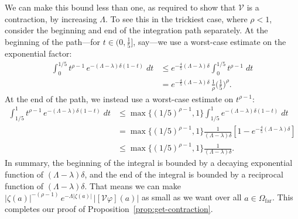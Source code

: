 \documentclass{article}
\theoremstyle{definition}
\theoremstyle{plain}
\newcommand{\volterra}{\mathcal{V}}
\newcommand{\far}{\Omega_\text{far}}
\begin{document}
We can make this bound less than one, as required to show that $\volterra$ is a contraction, by increasing $\Lambda$. To see this in the trickiest case, where $\rho < 1$, consider the beginning and end of the integration path separately. At the beginning of the path---for $t \in \big(0, \tfrac{1}{5}\big]$, say---we use a worst-case estimate on the exponential factor:
\begin{align*}
\int_0^{1/5} t^{\rho-1}\,e^{-(\Lambda - \lambda)\delta(1 - t)}\;dt & \le e^{-\frac{4}{5}(\Lambda -\lambda)\delta} \int_0^{1/5} t^{\rho-1}\;dt \\
& = e^{-\frac{4}{5}(\Lambda - \lambda)\delta}\,\tfrac{1}{\rho} \big(\tfrac{1}{5}\big)^\rho.
\end{align*}
At the end of the path, we instead use a worst-case estimate on $t^{\rho-1}$:
\begin{align*}
\int_{1/5}^1 t^{\rho-1}\,e^{-(\Lambda - \lambda)\delta(1 - t)}\;dt & \le \max\{(1/5)^{\rho-1}, 1\} \int_{1/5}^1 e^{-(\Lambda - \lambda)\delta(1 - t)}\;dt \\
& = \max\{(1/5)^{\rho-1}, 1\} \frac{1}{(\Lambda - \lambda)\delta}\left[ 1 - e^{-\tfrac{4}{5}(\Lambda - \lambda)\delta} \right] \\
& \le \max\{(1/5)^{\rho-1}, 1\} \frac{1}{(\Lambda - \lambda)\delta}.
\end{align*}
In summary, the beginning of the integral is bounded by a decaying exponential function of $(\Lambda - \lambda)\delta$, and the end of the integral is bounded by a reciprocal function of $(\Lambda - \lambda)\delta$. That means we can make $|\zeta(a)|^{-(\rho-1)}\,e^{-\Lambda|\zeta(a)|}\,\big|[\volterra\varphi](a)\big|$ as small as we want over all $a \in \far$. This completes our proof of Proposition~\ref{prop:get-contraction}.
\end{document}
